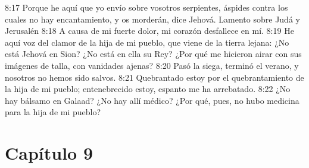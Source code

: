 8:17 Porque he aquí que yo envío sobre vosotros serpientes, áspides contra los cuales no hay encantamiento, y os morderán, dice Jehová. 
Lamento sobre Judá y Jerusalén 
8:18 A causa de mi fuerte dolor, mi corazón desfallece en mí. 
8:19 He aquí voz del clamor de la hija de mi pueblo, que viene de la tierra lejana: ¿No está Jehová en Sion? ¿No está en ella su Rey? ¿Por qué me hicieron airar con sus imágenes de talla, con vanidades ajenas? 
8:20 Pasó la siega, terminó el verano, y nosotros no hemos sido salvos. 
8:21 Quebrantado estoy por el quebrantamiento de la hija de mi pueblo; entenebrecido estoy, espanto me ha arrebatado. 
8:22 ¿No hay bálsamo en Galaad? ¿No hay allí médico? ¿Por qué, pues, no hubo medicina para la hija de mi pueblo? 
\section*{Capítulo 9 }
 
